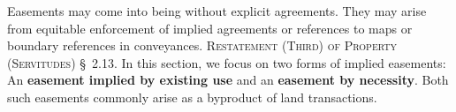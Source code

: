Easements may come into being without explicit agreements. They may arise from
equitable enforcement of implied agreements or references to maps or boundary
references in conveyances. \textsc{Restatement (Third) of Property (Servitudes)}
\S~2.13. In this section, we focus on two forms of implied easements: An
\textbf{easement implied by existing use} and an \textbf{easement by necessity}.
Both such easements commonly arise as a byproduct of land transactions.


